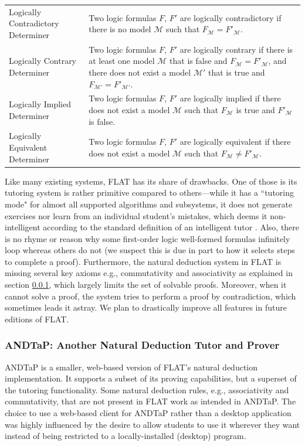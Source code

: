\documentclass[ms]{uncgdissertationexp2}
\theoremstyle{plain}
\theoremstyle{definition}
\theoremstyle{remark}
\begin{document}
\begin{table}
\begin{tabular}{p{3cm}p{11cm}}
	  Logically Contradictory Determiner&Two logic formulas $F$, $F'$ are logically contradictory if there is no model $\mathcal{M}$ such that $F_{\mathcal{M}} = F'_{\mathcal{M}}.$\\
	  Logically Contrary Determiner&Two logic formulas $F$, $F'$ are logically contrary if there is at least one model $\mathcal{M}$ that is false and $F_{\mathcal{M}} = F'_{\mathcal{M}}$, and there does not exist a model $\mathcal{M'}$ that is true and $F_{\mathcal{M'}} = F'_{\mathcal{M'}}$.\\
	  Logically Implied Determiner&Two logic formulas $F$, $F'$ are logically implied if there does not exist a model $\mathcal{M}$ such that $F_{\mathcal{M}}$ is true and $F'_{\mathcal{M}}$ is false.\\
	  Logically Equivalent Determiner&Two logic formulas $F$, $F'$ are logically equivalent if there does not exist a model $\mathcal{M}$ such that $F_{\mathcal{M}} \neq F'_{\mathcal{M}}$.\\
	\bottomrule
  \end{tabular}
\end{table}

Like many existing systems, FLAT has its share of drawbacks. One of those is its tutoring system is rather primitive compared to others---while it has a ``tutoring mode" for almost all supported algorithms and subsystems, it does not generate exercises nor learn from an individual student's mistakes, which deems it non-intelligent according to the standard definition of an intelligent tutor \cite{intelligenttutor}. Also, there is no rhyme or reason why some first-order logic well-formed formulas infinitely loop whereas others do not (we suspect this is due in part to how it selects steps to complete a proof). Furthermore, the natural deduction system in FLAT is missing several key axioms e.g., commutativity and associativity as explained in section \ref{section:andtap}, which largely limits the set of solvable proofs. Moreover, when it cannot solve a proof, the system tries to perform a proof by contradiction, which sometimes leads it astray. We plan to drastically improve all features in future editions of FLAT.

\subsubsection{ANDTaP: Another Natural Deduction Tutor and Prover}\label{section:andtap}
ANDTaP is a smaller, web-based version of FLAT's natural deduction implementation. It supports a subset of its proving capabilities, but a superset of the tutoring functionality. Some natural deduction rules, e.g., associativity and commutativity, that are not present in FLAT work as intended in ANDTaP. The choice to use a web-based client for ANDTaP rather than a desktop application was highly influenced by the desire to allow students to use it wherever they want instead of being restricted to a locally-installed (desktop) program.
\end{document}
